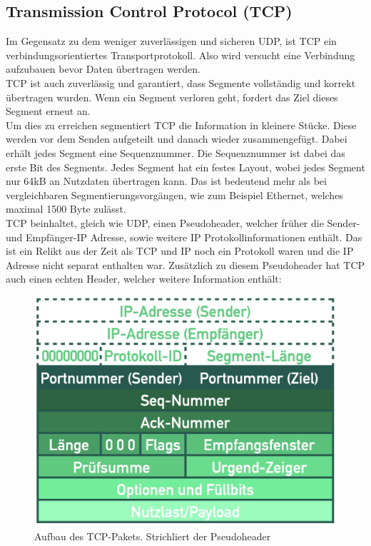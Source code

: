 \documentclass{article}
\begin{document}
	 \subsection{Transmission Control Protocol (TCP)}
	 Im Gegensatz zu dem weniger zuverlässigen und sicheren UDP, ist TCP ein verbindungsorientiertes Transportprotokoll. Also wird versucht eine Verbindung aufzubauen bevor Daten übertragen werden.\\
	 TCP ist auch zuverlässig und garantiert, dass Segmente vollständig und korrekt übertragen wurden. Wenn ein Segment verloren geht, fordert das Ziel dieses Segment erneut an. \\
	 Um dies zu erreichen segmentiert TCP die Information in kleinere Stücke. Diese werden vor dem Senden aufgeteilt und danach wieder zusammengefügt. Dabei erhält jedes Segment eine Sequenznummer. Die Sequenznummer ist dabei das erste Bit des Segments.
	 Jedes Segment hat ein festes Layout, wobei jedes Segment nur 64kB an Nutzdaten übertragen kann. Das ist bedeutend mehr als bei vergleichbaren Segmentierungsvorgängen, wie zum Beispiel Ethernet, welches maximal 1500 Byte zulässt. \\
	 TCP beinhaltet, gleich wie UDP, einen Pseudoheader, welcher früher die Sender- und Empfänger-IP Adresse, sowie weitere IP Protokollinformationen enthält. Das ist ein Relikt aus der Zeit als TCP und IP noch ein Protokoll waren und die IP Adresse nicht separat enthalten war.
	 Zusätzlich zu diesem Pseudoheader hat TCP auch einen echten Header, welcher weitere Information enthält:
	 \begin{figure}[H]
	 \centering
	 \includegraphics[scale=0.4]{Bilder/TCP.png}
	 \caption{Aufbau des TCP-Pakets. Strichliert der Pseudoheader}
	 \end{figure}
\end{document}
